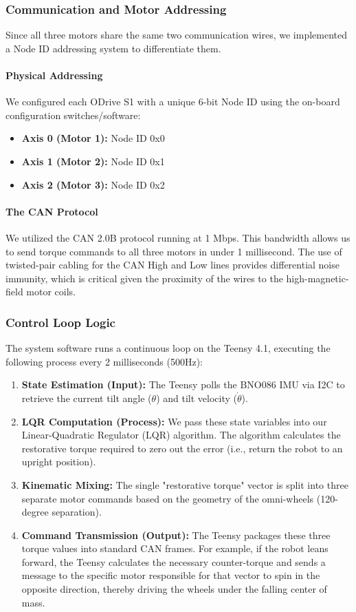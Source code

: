 \documentclass[12pt]{article}
\begin{document}
\subsubsection{Communication and Motor Addressing}
Since all three motors share the same two communication wires, we implemented a Node ID addressing system to differentiate them.

\paragraph{Physical Addressing}
We configured each ODrive S1 with a unique 6-bit Node ID using the on-board configuration switches/software:
\begin{itemize}
    \item \textbf{Axis 0 (Motor 1):} Node ID 0x0
    \item \textbf{Axis 1 (Motor 2):} Node ID 0x1
    \item \textbf{Axis 2 (Motor 3):} Node ID 0x2
\end{itemize}

\paragraph{The CAN Protocol}
We utilized the CAN 2.0B protocol running at 1 Mbps. This bandwidth allows us to send torque commands to all three motors in under 1 millisecond. The use of twisted-pair cabling for the CAN High and Low lines provides differential noise immunity, which is critical given the proximity of the wires to the high-magnetic-field motor coils.

\subsubsection{Control Loop Logic}
The system software runs a continuous loop on the Teensy 4.1, executing the following process every 2 milliseconds (500Hz):

\begin{enumerate}
    \item \textbf{State Estimation (Input):} The Teensy polls the BNO086 IMU via I2C to retrieve the current tilt angle ($\theta$) and tilt velocity ($\dot{\theta}$).
    \item \textbf{LQR Computation (Process):} We pass these state variables into our Linear-Quadratic Regulator (LQR) algorithm. The algorithm calculates the restorative torque required to zero out the error (i.e., return the robot to an upright position).
    \item \textbf{Kinematic Mixing:} The single "restorative torque" vector is split into three separate motor commands based on the geometry of the omni-wheels (120-degree separation).
    \item \textbf{Command Transmission (Output):} The Teensy packages these three torque values into standard CAN frames. For example, if the robot leans forward, the Teensy calculates the necessary counter-torque and sends a message to the specific motor responsible for that vector to spin in the opposite direction, thereby driving the wheels under the falling center of mass.
\end{enumerate}
\end{document}
